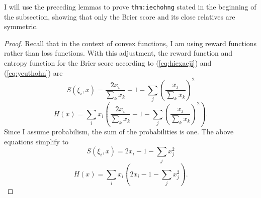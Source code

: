 \documentclass[12pt]{article}
\begin{document}

I will use the preceding lemmas to prove \texttt{thm:iechohng}
stated in the beginning of the subsection, showing that only the Brier
score and its close relatives are symmetric.

\begin{proof}
  \label{prf:quojeebo}
  Recall that in the context of convex
  functions, I am using reward functions rather than loss functions.
  With this adjustment, the reward function and entropy function for
  the Brier score according to (\ref{eq:hiexaeji}) and
  (\ref{eq:yeuthohn}) are
\begin{equation}
  \label{eq:lethaiqu}
    S(\xi_{i},x)=\frac{2x_{i}}{\sum_{k}x_{k}}-1-\sum_{j}\left(\frac{x_{j}}{\sum_{k}x_{k}}\right)^{2}
\end{equation}
\begin{equation}
  \label{eq:iviniewe}
    H(x)=\sum_{i}{}x_{i}\left(\frac{2x_{i}}{\sum_{k}x_{k}}-1-\sum_{j}\left(\frac{x_{j}}{\sum_{k}x_{k}}\right)^2\right).
\end{equation}
Since I assume probabilism, the sum of the probabilities is one. The
above equations simplify to
\begin{equation}
  \label{eq:doteeboo}
    S(\xi_{i},x)=2x_{i}-1-\sum_{j}x_{j}^{2}
\end{equation}
\begin{equation}
  \label{eq:piihieri}
    H(x)=\sum_{i}{}x_{i}\left(2x_{i}-1-\sum_{j}x_{j}^{2}\right).
\end{equation}


\end{proof}
\end{document}
